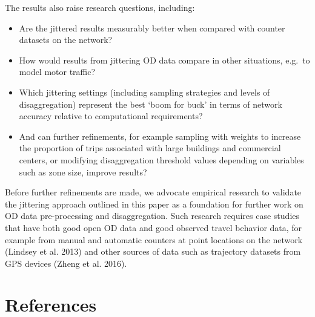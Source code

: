 \documentclass[
]{article}
\providecommand{\tightlist}{%
  \setlength{\itemsep}{0pt}\setlength{\parskip}{0pt}}
\begin{document}
The results also raise research questions, including:

\begin{itemize}
\tightlist
\item
  Are the jittered results measurably better when compared with counter datasets on the network?
\item
  How would results from jittering OD data compare in other situations, e.g.~to model motor traffic?
\item
  Which jittering settings (including sampling strategies and levels of disaggregation) represent the best `boom for buck' in terms of network accuracy relative to computational requirements?
\item
  And can further refinements, for example sampling with weights to increase the proportion of trips associated with large buildings and commercial centers, or modifying disaggregation threshold values depending on variables such as zone size, improve results?
\end{itemize}

Before further refinements are made, we advocate empirical research to validate the jittering approach outlined in this paper as a foundation for further work on OD data pre-processing and disaggregation.
Such research requires case studies that have both good open OD data and good observed travel behavior data, for example from manual and automatic counters at point locations on the network (Lindsey et al. 2013) and other sources of data such as trajectory datasets from GPS devices (Zheng et al. 2016).

\hypertarget{references}{%
\section*{References}\label{references}}
\end{document}

